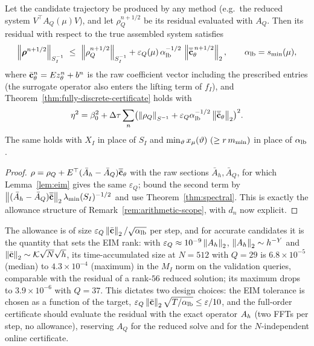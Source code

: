 \begin{theorem}\label{thm:eim-cert}
Let the candidate trajectory be produced by any method (e.g.\ the reduced
system $V^\top A_Q(\mu)V$), and let $\rho_Q^{n+1/2}$ be its residual
evaluated with $A_Q$.  Then its residual with respect to the true assembled
system satisfies
\[
 \norm{\rr^{n+1/2}}_{S_I^{-1}}\ \le\ \norm{\rho_Q^{n+1/2}}_{S_I^{-1}}
 +\varepsilon_Q(\mu)\,\alpha_{\rm lb}^{-1/2}\,\norm{\overline{\bar\cc}_\theta^{\,n+1/2}}_2,
 \qquad \alpha_{\rm lb}=\smin(\mu),
\]
where $\bar{\mathbf c}_\theta^n=Ez_\theta^n+b^n$ is the raw coefficient vector including the prescribed
entries (the surrogate operator also enters the lifting term of $f_I$), and
Theorem~\ref{thm:fully-discrete-certificate} holds with
\[
\eta^2=\beta_0^2+\Delta\tau\sum_n\bigl(\left\lVert \rho_Q\right\rVert_{S^{-1}}+\varepsilon_Q\alpha_{\rm lb}^{-1/2}\left\lVert \overline{\bar{\mathbf c}}_\theta\right\rVert_2\bigr)^2.
\]
The same holds with $X_I$ in place of $S_I$ and $\min_\vartheta \sym{x}_\mu(\vartheta)\ (\ge \rf\,m_{\min})$ in place of $\alpha_{\rm lb}$.
\end{theorem}
\begin{proof}
$\rho=\rho_Q+E^\top(\bar A_h-\bar A_Q)\overline{\bar{\mathbf c}}_\theta$ with the raw sections $\bar A_h,\bar A_Q$,
for which Lemma~\ref{lem:eim} gives the same $\varepsilon_Q$; bound the second term by
$\left\lVert (\bar A_h-\bar A_Q)\overline{\bar{\mathbf c}}\right\rVert_2\lambda_{\min}(S_I)^{-1/2}$ and use
Theorem~\ref{thm:spectral}.  This is exactly the allowance structure of
Remark~\ref{rem:arithmetic-scope}, with $d_n$ now explicit.
\end{proof}
The allowance is of size $\varepsilon_Q\left\lVert \bar{\mathbf c}\right\rVert_2/\sqrt{\alpha_{\rm lb}}$ per step, and for
accurate candidates it is the quantity that sets the EIM rank: with $\varepsilon_Q\approx10^{-9}\left\lVert A_h\right\rVert_2$,
$\left\lVert A_h\right\rVert_2\sim h^{-Y}$ and $\left\lVert \bar{\mathbf c}\right\rVert_2\sim \mathcal K\sqrt{N}\sqrt h$, its time-accumulated size at
$N=512$ with $Q=29$ is $6.8\times10^{-5}$ (median) to $4.3\times10^{-4}$ (maximum) in the $M_I$ norm on the
validation queries, comparable with the residual of a rank-$56$ reduced solution; its maximum drops to
$3.9\times10^{-6}$ with $Q=37$.  This dictates two design choices: the EIM tolerance is chosen as a
function of the target,
$\varepsilon_Q\left\lVert \bar{\mathbf c}\right\rVert_2\sqrt{T/\alpha_{\rm lb}}\le\varepsilon/10$, and the full-order
certificate should evaluate the residual with the exact operator $A_h$ (two FFTs per step, no
allowance), reserving $A_Q$ for the reduced solve and for the $N$-independent online certificate.
